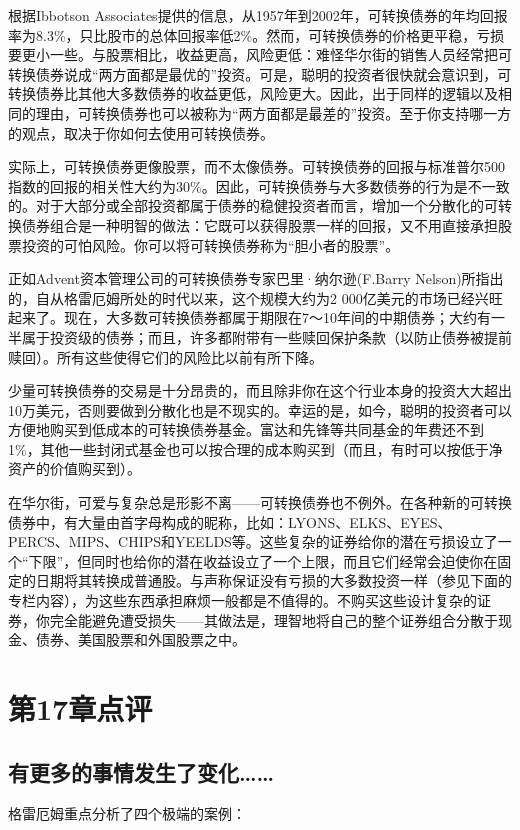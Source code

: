 \documentclass[12pt,oneside]{book}
\begin{document}
根据Ibbotson Associates提供的信息，从1957年到2002年，可转换债券的年均回报率为8.3\%，只比股市的总体回报率低2\%。然而，可转换债券的价格更平稳，亏损要更小一些。与股票相比，收益更高，风险更低：难怪华尔街的销售人员经常把可转换债券说成“两方面都是最优的”投资。可是，聪明的投资者很快就会意识到，可转换债券比其他大多数债券的收益更低，风险更大。因此，出于同样的逻辑以及相同的理由，可转换债券也可以被称为“两方面都是最差的”投资。至于你支持哪一方的观点，取决于你如何去使用可转换债券。

实际上，可转换债券更像股票，而不太像债券。可转换债券的回报与标准普尔500指数的回报的相关性大约为30\%。因此，可转换债券与大多数债券的行为是不一致的。对于大部分或全部投资都属于债券的稳健投资者而言，增加一个分散化的可转换债券组合是一种明智的做法：它既可以获得股票一样的回报，又不用直接承担股票投资的可怕风险。你可以将可转换债券称为“胆小者的股票”。

正如Advent资本管理公司的可转换债券专家巴里·纳尔逊(F.Barry Nelson)所指出的，自从格雷厄姆所处的时代以来，这个规模大约为2 000亿美元的市场已经兴旺起来了。现在，大多数可转换债券都属于期限在7～10年间的中期债券；大约有一半属于投资级的债券；而且，许多都附带有一些赎回保护条款（以防止债券被提前赎回）。所有这些使得它们的风险比以前有所下降。

少量可转换债券的交易是十分昂贵的，而且除非你在这个行业本身的投资大大超出10万美元，否则要做到分散化也是不现实的。幸运的是，如今，聪明的投资者可以方便地购买到低成本的可转换债券基金。富达和先锋等共同基金的年费还不到1\%，其他一些封闭式基金也可以按合理的成本购买到（而且，有时可以按低于净资产的价值购买到）。

在华尔街，可爱与复杂总是形影不离——可转换债券也不例外。在各种新的可转换债券中，有大量由首字母构成的昵称，比如：LYONS、ELKS、EYES、PERCS、MIPS、CHIPS和YEELDS等。这些复杂的证券给你的潜在亏损设立了一个“下限”，但同时也给你的潜在收益设立了一个上限，而且它们经常会迫使你在固定的日期将其转换成普通股。与声称保证没有亏损的大多数投资一样（参见下面的专栏内容），为这些东西承担麻烦一般都是不值得的。不购买这些设计复杂的证券，你完全能避免遭受损失——其做法是，理智地将自己的整个证券组合分散于现金、债券、美国股票和外国股票之中。



\section{第17章点评}
\subsection{有更多的事情发生了变化……}
格雷厄姆重点分析了四个极端的案例：
\end{document}
